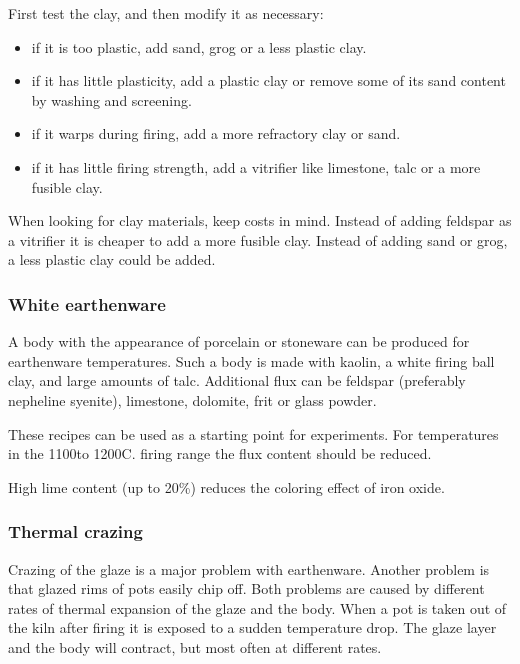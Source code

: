 First test the clay, and then modify it as necessary:
\begin{itemize}
\item if it is too plastic, add sand, grog or a less plastic clay.
\item if it has little plasticity, add a plastic clay or remove some of its 
sand content by washing and screening.
\item if it warps during firing, add a more refractory clay or sand.
\item if it has little firing strength, add a vitrifier like limestone, talc or 
a more fusible clay.
\end{itemize}
When looking for clay materials, keep costs in mind. Instead of adding feldspar 
as a vitrifier it is cheaper to add a more fusible clay. Instead of adding sand 
or grog, a less plastic clay could be added.
\subsubsection{White earthenware}
A body with the appearance of porcelain or stoneware can be produced for 
earthenware temperatures. Such a body is made with kaolin, a white firing ball 
clay, and large amounts of talc. Additional flux can be feldspar (preferably 
nepheline syenite), limestone, dolomite, frit or glass powder.

These recipes can be used as a starting point for experiments. For temperatures 
in the 1100\degree to 1200\degree C. firing range the flux content should 
be reduced.

High lime content (up to 20\%) reduces the coloring effect of iron oxide.
\subsubsection{Thermal crazing}
Crazing of the glaze is a major problem with earthenware. Another problem is 
that glazed rims of pots easily chip off. Both problems are caused by different 
rates of thermal expansion of the glaze and the body. When a pot is taken out 
of the kiln after firing it is exposed to a sudden temperature drop. The glaze 
layer and the body will contract, but most often at different rates. 

